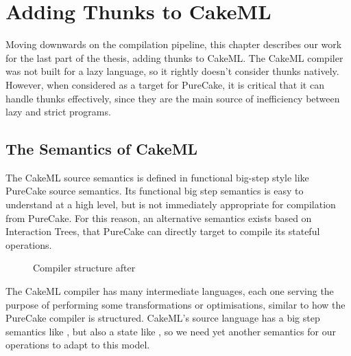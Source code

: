 \chapter{Adding Thunks to CakeML}
\label{chap:cakeml}

Moving downwards on the compilation pipeline, this chapter describes our work
for the last part of the thesis, adding thunks to CakeML. The CakeML compiler
was not built for a lazy language, so it rightly doesn't consider thunks
natively. However, when considered as a target for PureCake, it is critical that
it can handle thunks effectively, since they are the main source of inefficiency
between lazy and strict programs.

\section{The Semantics of CakeML}

The CakeML source semantics is defined in functional big-step style like
PureCake source semantics. Its functional big step semantics is easy to
understand at a high level, but is not immediately appropriate for compilation
from PureCake. For this reason, an alternative semantics exists based on
Interaction Trees, that PureCake can directly target to compile its stateful
operations.

\begin{figure}[h]
  \caption{Compiler structure after \StateLang{}}
\end{figure}

The CakeML compiler has many intermediate languages, each one serving the
purpose of performing some transformations or optimisations, similar to how the
PureCake compiler is structured. CakeML's source language has a big step
semantics like \ThunkLang{}, but also a state like \StateLang{}, so we need yet
another semantics for our operations to adapt to this model.

